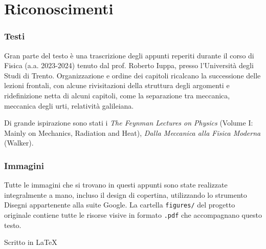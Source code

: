\section*{Riconoscimenti}

\subsubsection*{Testi}
Gran parte del testo è una trascrizione degli appunti reperiti durante
il corso di Fisica (a.a. 2023-2024) tenuto dal prof. Roberto Iuppa, presso
l'Università degli Studi di Trento. Organizzazione e ordine dei
capitoli ricalcano la successione delle lezioni frontali, con alcune
rivisitazioni della struttura degli argomenti e ridefinizione netta di
alcuni capitoli, come la separazione tra meccanica, meccanica degli urti,
relatività galileiana.

Di grande ispirazione sono stati i \textit{The Feynman Lectures on Physics}
(Volume I: Mainly on Mechanics, Radiation and Heat), \textit{Dalla Meccanica
alla Fisica Moderna} (Walker).

\subsubsection*{Immagini}
Tutte le immagini che si trovano in questi appunti sono state realizzate
integralmente a mano, incluso il design di copertina, utilizzando
lo strumento Disegni appartenente alla suite Google. La cartella
\texttt{figures/} del progetto originale contiene tutte le risorse visive
in formato \texttt{.pdf} che accompagnano questo testo.

\vfill
\begin{center}
    Scritto in \LaTeX
\end{center}
